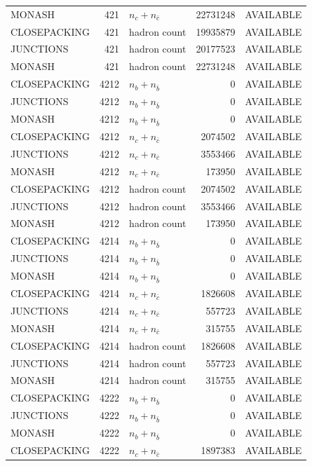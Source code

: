 \begin{landscape}
\begin{longtable}{@{}lrlrl@{}}
MONASH & 421 & $n_c+n_{\bar c}$ & \num{22731248} & AVAILABLE \\
CLOSEPACKING & 421 & hadron count & \num{19935879} & AVAILABLE \\
JUNCTIONS & 421 & hadron count & \num{20177523} & AVAILABLE \\
MONASH & 421 & hadron count & \num{22731248} & AVAILABLE \\
CLOSEPACKING & 4212 & $n_b+n_{\bar b}$ & \num{0} & AVAILABLE \\
JUNCTIONS & 4212 & $n_b+n_{\bar b}$ & \num{0} & AVAILABLE \\
MONASH & 4212 & $n_b+n_{\bar b}$ & \num{0} & AVAILABLE \\
CLOSEPACKING & 4212 & $n_c+n_{\bar c}$ & \num{2074502} & AVAILABLE \\
JUNCTIONS & 4212 & $n_c+n_{\bar c}$ & \num{3553466} & AVAILABLE \\
MONASH & 4212 & $n_c+n_{\bar c}$ & \num{173950} & AVAILABLE \\
CLOSEPACKING & 4212 & hadron count & \num{2074502} & AVAILABLE \\
JUNCTIONS & 4212 & hadron count & \num{3553466} & AVAILABLE \\
MONASH & 4212 & hadron count & \num{173950} & AVAILABLE \\
CLOSEPACKING & 4214 & $n_b+n_{\bar b}$ & \num{0} & AVAILABLE \\
JUNCTIONS & 4214 & $n_b+n_{\bar b}$ & \num{0} & AVAILABLE \\
MONASH & 4214 & $n_b+n_{\bar b}$ & \num{0} & AVAILABLE \\
CLOSEPACKING & 4214 & $n_c+n_{\bar c}$ & \num{1826608} & AVAILABLE \\
JUNCTIONS & 4214 & $n_c+n_{\bar c}$ & \num{557723} & AVAILABLE \\
MONASH & 4214 & $n_c+n_{\bar c}$ & \num{315755} & AVAILABLE \\
CLOSEPACKING & 4214 & hadron count & \num{1826608} & AVAILABLE \\
JUNCTIONS & 4214 & hadron count & \num{557723} & AVAILABLE \\
MONASH & 4214 & hadron count & \num{315755} & AVAILABLE \\
CLOSEPACKING & 4222 & $n_b+n_{\bar b}$ & \num{0} & AVAILABLE \\
JUNCTIONS & 4222 & $n_b+n_{\bar b}$ & \num{0} & AVAILABLE \\
MONASH & 4222 & $n_b+n_{\bar b}$ & \num{0} & AVAILABLE \\
CLOSEPACKING & 4222 & $n_c+n_{\bar c}$ & \num{1897383} & AVAILABLE \\

\end{longtable}
\end{landscape}
